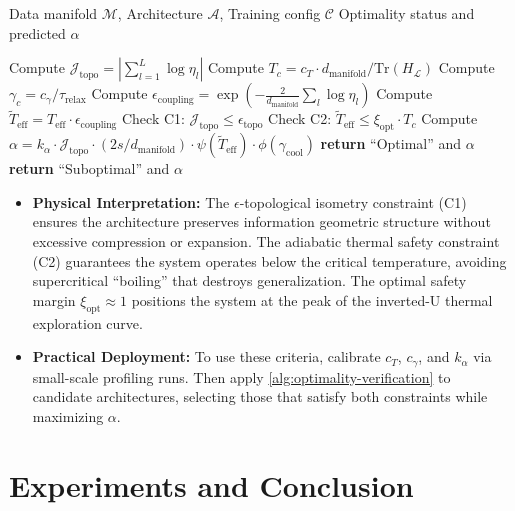 \documentclass[11pt, a4paper]{article}
\theoremstyle{definition}
\begin{document}
\begin{algorithm}[htbp]
\caption{Thermogeometric Optimality Verification}
\label{alg:optimality-verification}
\begin{algorithmic}[1]
\REQUIRE Data manifold $\mathcal{M}$, Architecture $\mathcal{A}$, Training config $\mathcal{C}$
\ENSURE Optimality status and predicted $\alpha$

\STATE Compute $\mathcal{J}_{\text{topo}} = \left|\sum_{l=1}^L \log \eta_l\right|$
\STATE Compute $T_c = c_T \cdot d_{\text{manifold}} / \text{Tr}(H_{\mathcal{L}})$
\STATE Compute $\gamma_c = c_\gamma / \tau_{\text{relax}}$
\STATE Compute $\epsilon_{\text{coupling}} = \exp\left(-\frac{2}{d_{\text{manifold}}}\sum_l \log \eta_l\right)$
\STATE Compute $\tilde{T}_{\text{eff}} = T_{\text{eff}} \cdot \epsilon_{\text{coupling}}$
\STATE Check C1: $\mathcal{J}_{\text{topo}} \leq \epsilon_{\text{topo}}$
\STATE Check C2: $\tilde{T}_{\text{eff}} \leq \xi_{\text{opt}} \cdot T_c$
\STATE Compute $\alpha = k_\alpha \cdot \mathcal{J}_{\text{topo}} \cdot (2s/d_{\text{manifold}}) \cdot \psi(\tilde{T}_{\text{eff}}) \cdot \phi(\gamma_{\text{cool}})$
 \STATE \textbf{return} ``Optimal'' and $\alpha$
\ELSE
 \STATE \textbf{return} ``Suboptimal'' and $\alpha$
\ENDIF
\end{algorithmic}
\end{algorithm}

\begin{itemize}
 \item \textbf{Physical Interpretation:} The $\epsilon$-topological isometry constraint (C1) ensures the architecture preserves information geometric structure without excessive compression or expansion. The adiabatic thermal safety constraint (C2) guarantees the system operates below the critical temperature, avoiding supercritical ``boiling'' that destroys generalization. The optimal safety margin $\xi_{\text{opt}} \approx 1$ positions the system at the peak of the inverted-U thermal exploration curve.
 \item \textbf{Practical Deployment:} To use these criteria, calibrate $c_T$, $c_\gamma$, and $k_\alpha$ via small-scale profiling runs. Then apply \cref{alg:optimality-verification} to candidate architectures, selecting those that satisfy both constraints while maximizing $\alpha$.
\end{itemize}

\section{Experiments and Conclusion}
\label{sec:experiments}
\end{document}
